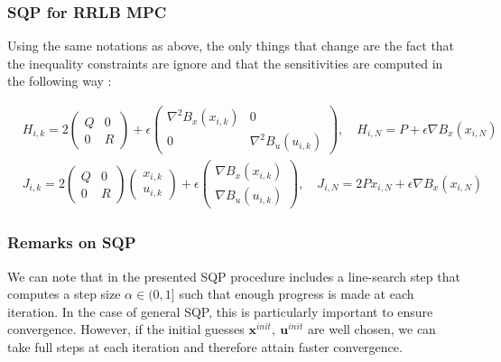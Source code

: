 \documentclass[12pt]{article}
\begin{document}
\subsubsection{SQP for RRLB MPC}

Using the same notations as above, the only things that change are the fact that the inequality constraints are ignore and that the sensitivities are computed in the following way :

\begin{align*}
	&H_{i,k}=2\begin{pmatrix}Q&0\\0&R\end{pmatrix}+\epsilon\begin{pmatrix}\nabla^2B_x(x_{i,k})&0\\0&\nabla^2B_u(u_{i,k})\end{pmatrix},\quad H_{i,N}=P+\epsilon\nabla B_x(x_{i,N})\\
	&J_{i,k}=2\begin{pmatrix}Q&0\\0&R\end{pmatrix}\begin{pmatrix} x_{i,k}\\ u_{i,k}\end{pmatrix}+\epsilon\begin{pmatrix}\nabla B_x(x_{i,k})\\\nabla B_u(u_{i,k})\end{pmatrix},\quad J_{i,N}=2P x_{i,N}+\epsilon\nabla B_x(x_{i,N})
\end{align*}

\subsubsection{Remarks on SQP}

We can note that in \cite{mpc-rti} the presented SQP procedure includes a line-search step that computes a step size $\alpha\in(0,1]$ such that enough progress is made at each iteration.
In the case of general SQP, this is particularly important to ensure convergence.
However, if the initial guesses $\mathbf{x}^{init},~\mathbf{u}^{init}$ are well chosen, we can take full steps at each iteration and therefore attain faster convergence.
\end{document}
